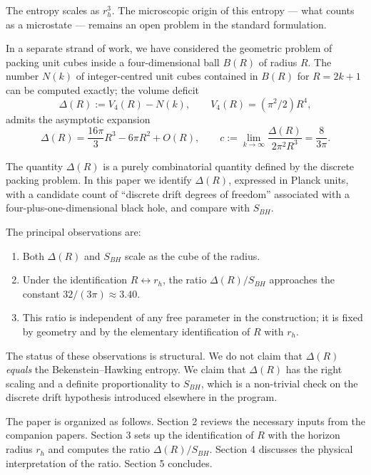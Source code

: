 \documentclass[a4paper,11pt]{article}
\theoremstyle{definition}
\providecommand{\tightlist}{\setlength{\itemsep}{0pt}\setlength{\parskip}{0pt}}
\begin{document}
The entropy scales as \(r_h^3\). The microscopic origin of this entropy
--- what counts as a microstate --- remains an open problem in the
standard formulation.

In a separate strand of work, we have considered the geometric problem
of packing unit cubes inside a four-dimensional ball \(B(R)\) of radius
\(R\). The number \(N(k)\) of integer-centred unit cubes contained in
\(B(R)\) for \(R = 2k+1\) can be computed exactly; the volume deficit
\[\Delta(R) := V_4(R) - N(k), \qquad V_4(R) = (\pi^2/2) R^4,\] admits
the asymptotic expansion
\[\Delta(R) = \frac{16\pi}{3} R^3 - 6\pi R^2 + O(R), \qquad c := \lim_{k\to\infty} \frac{\Delta(R)}{2\pi^2 R^3} = \frac{8}{3\pi}.\]

The quantity \(\Delta(R)\) is a purely combinatorial quantity defined by
the discrete packing problem. In this paper we identify \(\Delta(R)\),
expressed in Planck units, with a candidate count of ``discrete drift
degrees of freedom'' associated with a four-plus-one-dimensional black
hole, and compare with \(S_{BH}\).

The principal observations are:

\begin{enumerate}
\def\labelenumi{\arabic{enumi}.}
\tightlist
\item
  Both \(\Delta(R)\) and \(S_{BH}\) scale as the cube of the radius.
\item
  Under the identification \(R \leftrightarrow r_h\), the ratio
  \(\Delta(R)/S_{BH}\) approaches the constant
  \(32/(3\pi) \approx 3.40\).
\item
  This ratio is independent of any free parameter in the construction;
  it is fixed by geometry and by the elementary identification of \(R\)
  with \(r_h\).
\end{enumerate}

The status of these observations is structural. We do not claim that
\(\Delta(R)\) \emph{equals} the Bekenstein--Hawking entropy. We claim
that \(\Delta(R)\) has the right scaling and a definite proportionality
to \(S_{BH}\), which is a non-trivial check on the discrete drift
hypothesis introduced elsewhere in the program.

The paper is organized as follows. Section 2 reviews the necessary
inputs from the companion papers. Section 3 sets up the identification
of \(R\) with the horizon radius \(r_h\) and computes the ratio
\(\Delta(R)/S_{BH}\). Section 4 discusses the physical interpretation of
the ratio. Section 5 concludes.
\end{document}
